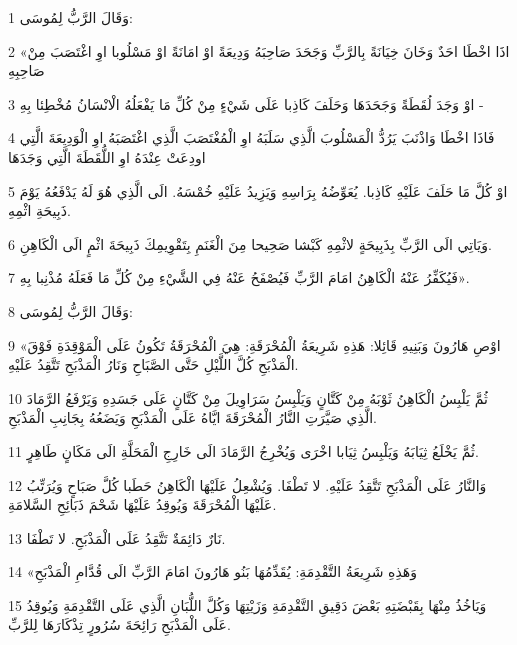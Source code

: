 \par 1 وَقَالَ الرَّبُّ لِمُوسَى:
\par 2 «اذَا اخْطَا احَدٌ وَخَانَ خِيَانَةً بِالرَّبِّ وَجَحَدَ صَاحِبَهُ وَدِيعَةً اوْ امَانَةً اوْ مَسْلُوبا اوِ اغْتَصَبَ مِنْ صَاحِبِهِ
\par 3 اوْ وَجَدَ لُقَطَةً وَجَحَدَهَا وَحَلَفَ كَاذِبا عَلَى شَيْءٍ مِنْ كُلِّ مَا يَفْعَلُهُ الْانْسَانُ مُخْطِئا بِهِ -
\par 4 فَاذَا اخْطَا وَاذْنَبَ يَرُدُّ الْمَسْلُوبَ الَّذِي سَلَبَهُ اوِ الْمُغْتَصَبَ الَّذِي اغْتَصَبَهُ اوِ الْوَدِيعَةَ الَّتِي اودِعَتْ عِنْدَهُ اوِ اللُّقَطَةَ الَّتِي وَجَدَهَا
\par 5 اوْ كُلَّ مَا حَلَفَ عَلَيْهِ كَاذِبا. يُعَوِّضُهُ بِرَاسِهِ وَيَزِيدُ عَلَيْهِ خُمْسَهُ. الَى الَّذِي هُوَ لَهُ يَدْفَعُهُ يَوْمَ ذَبِيحَةِ اثْمِهِ.
\par 6 وَيَاتِي الَى الرَّبِّ بِذَبِيحَةٍ لاثْمِهِ كَبْشا صَحِيحا مِنَ الْغَنَمِ بِتَقْوِيمِكَ ذَبِيحَةَ اثْمٍ الَى الْكَاهِنِ.
\par 7 فَيُكَفِّرُ عَنْهُ الْكَاهِنُ امَامَ الرَّبِّ فَيُصْفَحُ عَنْهُ فِي الشَّيْءِ مِنْ كُلِّ مَا فَعَلَهُ مُذْنِبا بِهِ».
\par 8 وَقَالَ الرَّبُّ لِمُوسَى:
\par 9 «اوْصِ هَارُونَ وَبَنِيهِ قَائِلا: هَذِهِ شَرِيعَةُ الْمُحْرَقَةِ: هِيَ الْمُحْرَقَةُ تَكُونُ عَلَى الْمَوْقِدَةِ فَوْقَ الْمَذْبَحِ كُلَّ اللَّيْلِ حَتَّى الصَّبَاحِ وَنَارُ الْمَذْبَحِ تَتَّقِدُ عَلَيْهِ.
\par 10 ثُمَّ يَلْبِسُ الْكَاهِنُ ثَوْبَهُ مِنْ كَتَّانٍ وَيَلْبِسُ سَرَاوِيلَ مِنْ كَتَّانٍ عَلَى جَسَدِهِ وَيَرْفَعُ الرَّمَادَ الَّذِي صَيَّرَتِ النَّارُ الْمُحْرَقَةَ ايَّاهُ عَلَى الْمَذْبَحِ وَيَضَعُهُ بِجَانِبِ الْمَذْبَحِ.
\par 11 ثُمَّ يَخْلَعُ ثِيَابَهُ وَيَلْبِسُ ثِيَابا اخْرَى وَيُخْرِجُ الرَّمَادَ الَى خَارِجِ الْمَحَلَّةِ الَى مَكَانٍ طَاهِرٍ.
\par 12 وَالنَّارُ عَلَى الْمَذْبَحِ تَتَّقِدُ عَلَيْهِ. لا تَطْفَا. وَيُشْعِلُ عَلَيْهَا الْكَاهِنُ حَطَبا كُلَّ صَبَاحٍ وَيُرَتِّبُ عَلَيْهَا الْمُحْرَقَةَ وَيُوقِدُ عَلَيْهَا شَحْمَ ذَبَائِحِ السَّلامَةِ.
\par 13 نَارٌ دَائِمَةٌ تَتَّقِدُ عَلَى الْمَذْبَحِ. لا تَطْفَا.
\par 14 «وَهَذِهِ شَرِيعَةُ التَّقْدِمَةِ: يُقَدِّمُهَا بَنُو هَارُونَ امَامَ الرَّبِّ الَى قُدَّامِ الْمَذْبَحِ
\par 15 وَيَاخُذُ مِنْهَا بِقَبْضَتِهِ بَعْضَ دَقِيقِ التَّقْدِمَةِ وَزَيْتِهَا وَكُلَّ اللُّبَانِ الَّذِي عَلَى التَّقْدِمَةِ وَيُوقِدُ عَلَى الْمَذْبَحِ رَائِحَةَ سُرُورٍ تِذْكَارَهَا لِلرَّبِّ.
